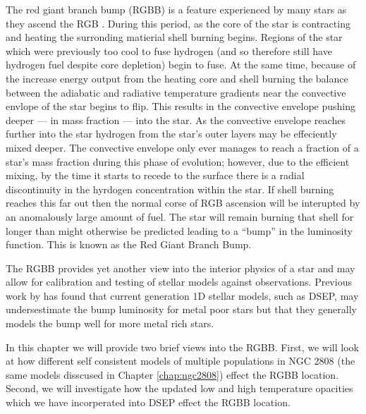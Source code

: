 The red giant branch bump (RGBB) is a feature experienced by many stars as they
ascend the RGB \citep{Riello2003}. During this period, as the core of the star
is contracting and heating the surronding matierial shell burning begins.
Regions of the star which were previously too cool to fuse hydrogen (and so
therefore still have hydrogen fuel despite core depletion) begin to fuse. At
the same time, because of the increase energy output from the heating core and
shell burning the balance between the adiabatic and radiative temperature
gradients near the convective envlope of the star begins to flip. This results
in the convective envelope pushing deeper --- in mass fraction --- into the
star. As the convective envelope reaches further into the star hydrogen from
the star's outer layers may be effeciently mixed deeper. The convective envelope
only ever manages to reach a fraction of a star's mass fraction during this
phase of evolution; however, due to the efficient mixing, by the time it starts
to recede to the surface there is a radial discontinuity in the hyrdogen
concentration within the star. If shell burning reaches this far out then the
normal corse of RGB ascension will be interupted by an anomalously large amount
of fuel. The star will remain burning that shell for longer than might
otherwise be predicted leading to a ``bump'' in the luminosity function. This
is known as the Red Giant Branch Bump.

The RGBB provides yet another view into the interior physics of a star and may
allow for calibration and testing of stellar models against observations.
Previous work by \citet{Joyce2016} has found that current
generation 1D stellar models, such as DSEP, may undersestimate the bump
luminosity for metal poor stars but that they generally models the bump well
for more metal rich stars.

In this chapter we will provide two brief views into the RGBB. First, we will
look at how different self consistent models of multiple populations in NGC
2808 (the same models disscused in Chapter \ref{chap:ngc2808}) effect the
RGBB location. Second, we will investigate how the updated low and high
temperature opacities which we have incorperated into DSEP effect the RGBB
location.

